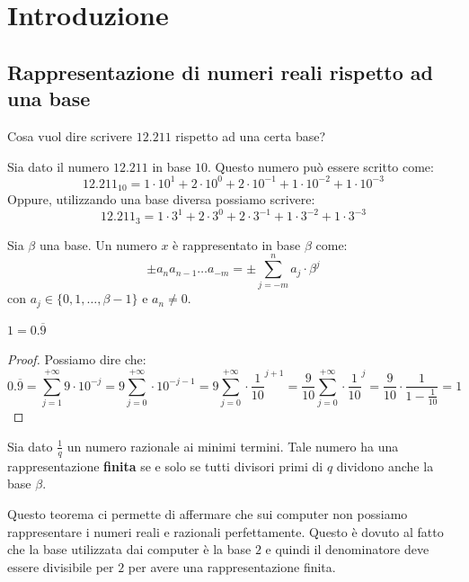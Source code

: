 \chapter{Introduzione}
\section{Rappresentazione di numeri reali rispetto ad una base}
\begin{esempio}
    Cosa vuol dire scrivere $12.211$ rispetto ad una certa base?

    Sia dato il numero $12.211$ in base $10$. Questo numero può essere scritto
    come:
    \begin{equation*}
        12.211_{10} = 1\cdot 10^1+2\cdot 10^0 +2 \cdot 10^{-1} + 1 \cdot 10^{-2}
        + 1 \cdot 10^{-3}
    \end{equation*}
    Oppure, utilizzando una base diversa possiamo scrivere:
    \begin{equation*}
        12.211_{3} = 1\cdot 3^1+2\cdot 3^0 +2 \cdot 3^{-1} + 1 \cdot 3^{-2}
        + 1 \cdot 3^{-3}
    \end{equation*}
\end{esempio}
\begin{definizione}
    Sia $\beta$ una base. Un numero $x$ è rappresentato in base $\beta$ come:
    \begin{equation}
        \pm a_n a_{n-1} \dots a_{-m} = \pm \sum_{j = -m}^{n} a_j \cdot \beta^j
    \end{equation}
    con $a_j \in \{0, 1, \dots, \beta-1\}$ e $a_n \neq 0$.
\end{definizione}
\begin{teorema}
    $1=0.\overline{9}$
    \begin{proof}
        Possiamo dire che:
        \begin{equation*}
            0.\overline{9} = \sum_{j = 1}^{+ \infty} 9 \cdot 10^{-j} = 9
            \sum_{j=0}^{+\infty} \cdot 10^{-j-1} = 9 \sum_{j = 0}^{+\infty} \cdot
            \frac{1}{10}^{j+1} = \frac{9}{10} \sum _{j=0}^{+\infty} \cdot \frac{1}{10}^{j} =
            \frac{9}{10} \cdot \frac{1}{1-\frac{1}{10}} = 1
        \end{equation*}
    \end{proof}
\end{teorema}
\begin{teorema}
    Sia dato $\frac{1}{q}$ un numero razionale ai minimi termini. Tale numero ha
    una rappresentazione \textbf{finita} se e solo se tutti divisori primi di $q$
    dividono anche la base $\beta$.
\end{teorema}
Questo teorema ci permette di affermare che sui computer non possiamo
rappresentare i numeri reali e razionali perfettamente. Questo è dovuto al fatto
che la base utilizzata dai computer è la base $2$ e quindi il denominatore deve
essere divisibile per $2$ per avere una rappresentazione finita.
